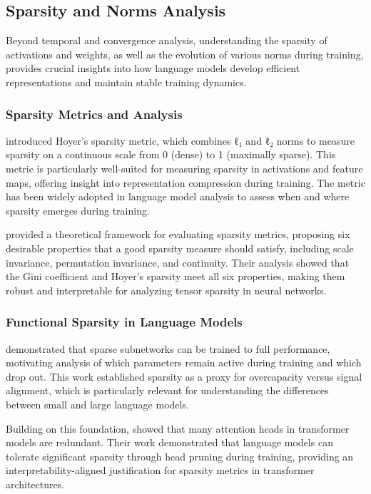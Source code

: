 \subsection{Sparsity and Norms Analysis}

Beyond temporal and convergence analysis, understanding the sparsity of activations and weights, as well as the evolution of various norms during training, provides crucial insights into how language models develop efficient representations and maintain stable training dynamics.

\subsubsection{Sparsity Metrics and Analysis}

\citet{hoyer2004sparsity} introduced Hoyer's sparsity metric, which combines ℓ₁ and ℓ₂ norms to measure sparsity on a continuous scale from 0 (dense) to 1 (maximally sparse). This metric is particularly well-suited for measuring sparsity in activations and feature maps, offering insight into representation compression during training. The metric has been widely adopted in language model analysis to assess when and where sparsity emerges during training.

\citet{hurley2009gini} provided a theoretical framework for evaluating sparsity metrics, proposing six desirable properties that a good sparsity measure should satisfy, including scale invariance, permutation invariance, and continuity. Their analysis showed that the Gini coefficient and Hoyer's sparsity meet all six properties, making them robust and interpretable for analyzing tensor sparsity in neural networks.

\subsubsection{Functional Sparsity in Language Models}

\citet{frankle2019lottery} demonstrated that sparse subnetworks can be trained to full performance, motivating analysis of which parameters remain active during training and which drop out. This work established sparsity as a proxy for overcapacity versus signal alignment, which is particularly relevant for understanding the differences between small and large language models.

Building on this foundation, \citet{michel2019sixteen} showed that many attention heads in transformer models are redundant. Their work demonstrated that language models can tolerate significant sparsity through head pruning during training, providing an interpretability-aligned justification for sparsity metrics in transformer architectures.

